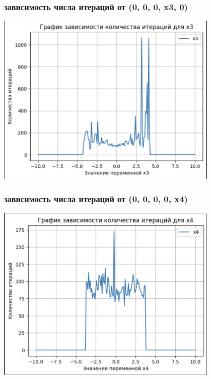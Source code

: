 \documentclass[12pt,pdf,hyperref={unicode}]{beamer}
\begin{document}
\begin{frame}
\frametitle{зависимость числа итераций от (0, 0, 0, x3, 0) }
\begin{center}
    \includegraphics[width=0.8\textwidth]{x3.png}
\end{center}
\end{frame}

\begin{frame}
\frametitle{зависимость числа итераций от (0, 0, 0, 0, x4) }
\begin{center}
    \includegraphics[width=0.8\textwidth]{x4.png}
\end{center}
\end{frame}
\end{document}
